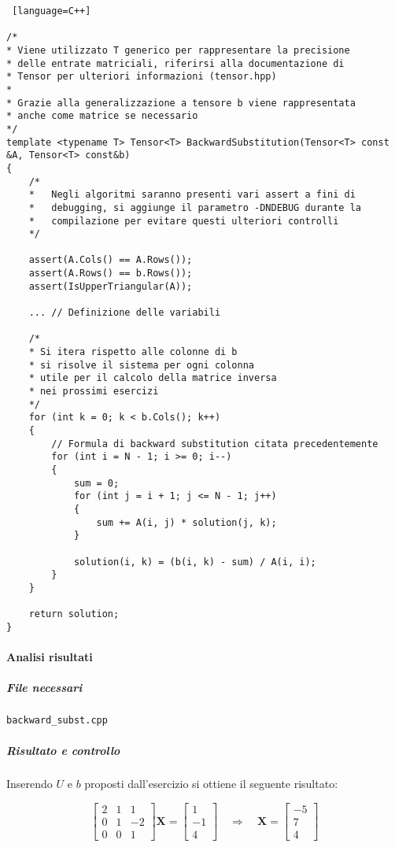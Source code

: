 \begin{lstlisting} [language=C++]

/*
* Viene utilizzato T generico per rappresentare la precisione 
* delle entrate matriciali, riferirsi alla documentazione di 
* Tensor per ulteriori informazioni (tensor.hpp)
*
* Grazie alla generalizzazione a tensore b viene rappresentata 
* anche come matrice se necessario
*/
template <typename T> Tensor<T> BackwardSubstitution(Tensor<T> const &A, Tensor<T> const&b)
{
    /*
    *   Negli algoritmi saranno presenti vari assert a fini di 
    *   debugging, si aggiunge il parametro -DNDEBUG durante la 
    *   compilazione per evitare questi ulteriori controlli
    */

    assert(A.Cols() == A.Rows());
    assert(A.Rows() == b.Rows());
    assert(IsUpperTriangular(A));

    ... // Definizione delle variabili

    /* 
    * Si itera rispetto alle colonne di b 
    * si risolve il sistema per ogni colonna
    * utile per il calcolo della matrice inversa
    * nei prossimi esercizi
    */
    for (int k = 0; k < b.Cols(); k++)
    {
        // Formula di backward substitution citata precedentemente
        for (int i = N - 1; i >= 0; i--)
        {
            sum = 0;
            for (int j = i + 1; j <= N - 1; j++)
            {
                sum += A(i, j) * solution(j, k);
            }

            solution(i, k) = (b(i, k) - sum) / A(i, i);
        }
    }

    return solution;
}

\end{lstlisting}

\newpage

\paragraph{Analisi risultati}

\subparagraph{File necessari} \texttt{backward\_subst.cpp}

\subparagraph{Risultato e controllo}

Inserendo $U$ e $b$ proposti dall'esercizio si ottiene il seguente risultato:

$$
	\begin{bmatrix}
		2 & 1 & 1  \\
		0 & 1 & -2 \\
		0 & 0 & 1
	\end{bmatrix} \mathbf{X} = \begin{bmatrix}
		1 \\ -1 \\ 4 \end{bmatrix}
	\quad \Rightarrow \quad \mathbf{X} = \begin{bmatrix} -5 \\ 7 \\ 4 \end{bmatrix}
$$

